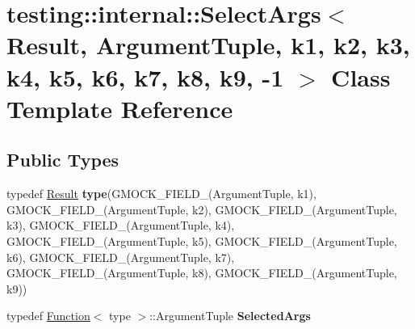 \hypertarget{classtesting_1_1internal_1_1SelectArgs_3_01Result_00_01ArgumentTuple_00_01k1_00_01k2_00_01k3_00_a44b2a3fb6bab261818c61ba2b7f389a}{}\section{testing\+:\+:internal\+:\+:Select\+Args$<$ Result, Argument\+Tuple, k1, k2, k3, k4, k5, k6, k7, k8, k9, -\/1 $>$ Class Template Reference}
\label{classtesting_1_1internal_1_1SelectArgs_3_01Result_00_01ArgumentTuple_00_01k1_00_01k2_00_01k3_00_a44b2a3fb6bab261818c61ba2b7f389a}
\subsection*{Public Types}
\begin{DoxyCompactItemize}
\item 
\mbox{\label{classtesting_1_1internal_1_1SelectArgs_3_01Result_00_01ArgumentTuple_00_01k1_00_01k2_00_01k3_00_a44b2a3fb6bab261818c61ba2b7f389a_a854bb83e6677b7a1d6ad4c1ffe81bf63}} 
typedef \hyperlink{classResult}{Result} {\bfseries type}(G\+M\+O\+C\+K\+\_\+\+F\+I\+E\+L\+D\+\_\+(Argument\+Tuple, k1), G\+M\+O\+C\+K\+\_\+\+F\+I\+E\+L\+D\+\_\+(Argument\+Tuple, k2), G\+M\+O\+C\+K\+\_\+\+F\+I\+E\+L\+D\+\_\+(Argument\+Tuple, k3), G\+M\+O\+C\+K\+\_\+\+F\+I\+E\+L\+D\+\_\+(Argument\+Tuple, k4), G\+M\+O\+C\+K\+\_\+\+F\+I\+E\+L\+D\+\_\+(Argument\+Tuple, k5), G\+M\+O\+C\+K\+\_\+\+F\+I\+E\+L\+D\+\_\+(Argument\+Tuple, k6), G\+M\+O\+C\+K\+\_\+\+F\+I\+E\+L\+D\+\_\+(Argument\+Tuple, k7), G\+M\+O\+C\+K\+\_\+\+F\+I\+E\+L\+D\+\_\+(Argument\+Tuple, k8), G\+M\+O\+C\+K\+\_\+\+F\+I\+E\+L\+D\+\_\+(Argument\+Tuple, k9))
\item 
\mbox{\label{classtesting_1_1internal_1_1SelectArgs_3_01Result_00_01ArgumentTuple_00_01k1_00_01k2_00_01k3_00_a44b2a3fb6bab261818c61ba2b7f389a_a6f5cac5d2d8eb14d972efd6247c296c8}} 
typedef \hyperlink{structtesting_1_1internal_1_1Function}{Function}$<$ type $>$\+::Argument\+Tuple {\bfseries Selected\+Args}
\end{DoxyCompactItemize}
